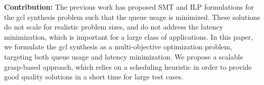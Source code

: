 \textbf{Contribution:} The previous work has proposed SMT and ILP formulations for the \gls{gcl} synthesis problem such that the queue usage is minimized. These solutions do not scale for realistic problem sizes, and do not address the latency minimization, which is important for a large class of applications. In this paper, we formulate the \gls{gcl} synthesis as a multi-objective optimization problem, targeting both queue usage and latency minimization. We propose a scalable \gls{grasp}-based approach, which relies on a scheduling heuristic in order to provide good quality solutions in a short time for large test cases.